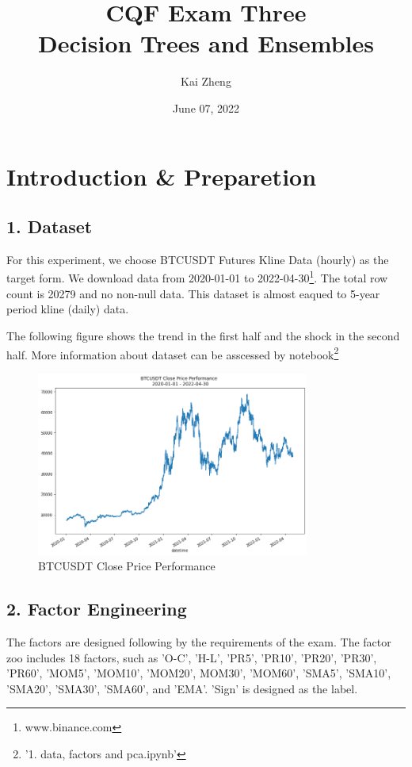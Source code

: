 \documentclass[UTF8]{ctexart}
\title{\vspace{-1cm}CQF Exam Three\\Decision Trees and Ensembles}
\author{Kai Zheng}
\date{June 07, 2022}
\begin{document}
\maketitle

\section*{Introduction \& Preparetion}

\subsection*{1. Dataset}

For this experiment, we choose BTCUSDT Futures Kline Data (hourly) as the target form. We download data from 2020-01-01 to 2022-04-30\footnote{www.binance.com}. The total row count is 20279 and no non-null data. This dataset is almost eaqued to 5-year period kline (daily) data.

The following figure shows the trend in the first half and the shock in the second half. More information about dataset can be asscessed by notebook\footnote{'1. data, factors and pca.ipynb'}

\begin{figure}[htbp]
	\centerline{\includegraphics[width=0.80\textwidth]{close_price.png}}
	\caption{BTCUSDT Close Price Performance}
\end{figure}

\subsection*{2. Factor Engineering}

The factors are designed following by the requirements of the exam. The factor zoo includes 18 factors, such as 'O-C', 'H-L', 'PR5', 'PR10', 'PR20', 'PR30', 'PR60', 'MOM5', 'MOM10', 'MOM20', MOM30', 'MOM60', 'SMA5', 'SMA10', 'SMA20', 'SMA30', 'SMA60', and 'EMA'. 'Sign' is designed as the label.
\end{document}
